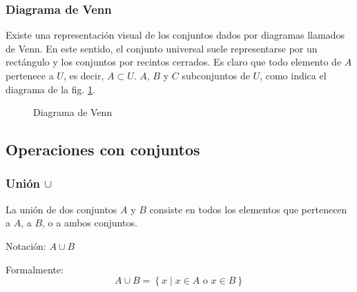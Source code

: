 \subsubsection{Diagrama de Venn}

Existe una representación visual de los conjuntos dados por diagramas llamados de Venn. En este sentido, el conjunto universal suele representarse por un rectángulo y los conjuntos por recintos cerrados. Es claro que todo elemento de $A$ pertenece a $U$, es decir, $A \subset U$. $A$, $B$ y $C$ subconjuntos de $U$, como indica el diagrama de la fig. \ref{fig:Venn}.

\begin{figure}[H]
	\centering
	\caption{Diagrama de Venn}
	\label{fig:Venn}
\end{figure}

\subsection{Operaciones con conjuntos}

\subsubsection{Unión $\cup$}
\vspace{1em}
\begin{fmd-definition}[Unión]
	La unión de dos conjuntos \(A\) y \(B\) consiste en todos los elementos que pertenecen a \(A\), a \(B\), o a ambos conjuntos.
	
	Notación: \(A \cup B\)
	
	Formalmente:
	\[ A \cup B = \left\{ x \mid x \in A \mbox{ o } x \in B \right\} \]
\end{fmd-definition}

